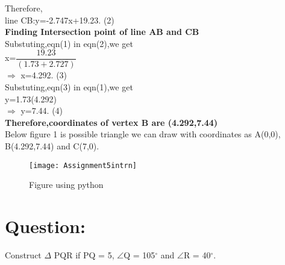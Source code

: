 \documentclass[a4paper,12pt]{article}
\begin{document}
Therefore,\\

\hspace*{0.5cm}line CB:y=-2.747x+19.23.   \hspace*{2.5cm}(2) \\

\pagebreak
\textbf{Finding Intersection point of line AB and CB}\\

Substuting,eqn(1) in eqn(2),we get\\

x=$\dfrac{19.23}{(1.73+2.727)}$\\

$\Rightarrow$ x=4.292.\hspace*{3cm} (3)\\

Substuting,eqn(3) in eqn(1),we get\\

y=1.73(4.292)\\

$\Rightarrow$ y=7.44.\hspace*{3cm} (4)\\

\textbf{Therefore,coordinates of vertex B are (4.292,7.44)}\\

Below figure 1 is possible triangle we can draw with coordinates
\hspace*{0.5cm} as A(0,0), B(4.292,7.44) and C(7,0).\\

\vspace*{1cm} 
 
\begin{figure}[h]
\centering
\texttt{[image: Assignment5intrn]}
\caption{Figure using python}
\end{figure}

\pagebreak

\section*{\small Question:}
Construct $\Delta$ PQR if PQ = 5, $\angle$Q = 105$^{\circ}$ and $\angle$R = 40$^{\circ}$.
\end{document}
